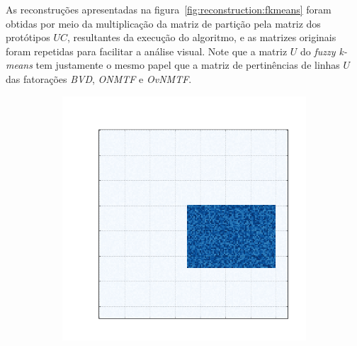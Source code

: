 \documentclass[
    12pt,                %
    oneside,            %
    a4paper,            %
    english,            %
    brazil                %
    ]{abntex2ppgsi}
\begin{document}
As reconstruções apresentadas na figura~\ref{fig:reconstruction:fkmeans} foram obtidas por meio da multiplicação da matriz de partição pela matriz dos protótipos $UC$, resultantes da execução do algoritmo, e as matrizes originais foram repetidas para facilitar a análise visual.
Note que a matriz $U$ do \textit{fuzzy k-means} tem justamente o mesmo papel que a matriz de pertinências de linhas $U$ das fatorações \textit{BVD}, \textit{ONMTF} e \textit{OvNMTF}.

\begin{figure}[H]
\centering
    \caption{
        As primeiras cinco matrizes são as matrizes originais, as demais são suas respectivas reconstruções, realizadas a partir dos resultados obtidos com o algorimto \textit{fuzzy k-means}.
    }
    \begin{subfigure}[b]{0.18\textwidth}
        \includegraphics[width=\textwidth]{img/a-bic-structure.png}
    \end{subfigure}
    \begin{subfigure}[b]{0.18\textwidth}

\end{subfigure}
\end{figure}
\end{document}
